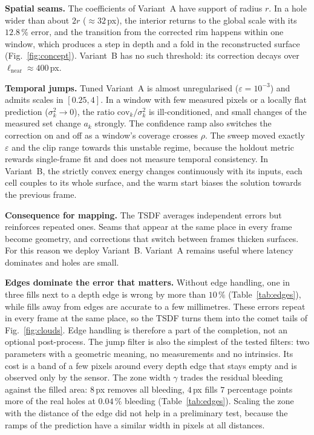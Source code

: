\documentclass[conference]{IEEEtran}
\begin{document}
\textbf{Spatial seams.} The coefficients of Variant~A have support of radius
\(r\). In a hole wider than about \(2r\) (\(\approx\!32\,\)px), the interior
returns to the global scale with its \(12.8\,\%\) error, and the transition
from the corrected rim happens within one window, which produces a step in
depth and a fold in the reconstructed surface (Fig.~\ref{fig:concept}).
Variant~B has no such threshold: its correction decays over
\(\ell_{\mathrm{near}}\approx400\,\)px.

\textbf{Temporal jumps.} Tuned Variant~A is almost unregularised
(\(\varepsilon=10^{-3}\)) and admits scales in \([0.25,4]\). In a window with
few measured pixels or a locally flat prediction (\(\sigma^2_k\to0\)), the
ratio \(\mathrm{cov}_k/\sigma^2_k\) is ill-conditioned, and small changes of
the measured set change \(a_k\) strongly. The confidence ramp also switches the
correction on and off as a window's coverage crosses \(\rho\). The sweep moved
exactly \(\varepsilon\) and the clip range towards this unstable regime,
because the holdout metric rewards single-frame fit and does not measure
temporal consistency. In Variant~B, the strictly convex energy changes
continuously with its inputs, each cell couples to its whole surface, and the
warm start biases the solution towards the previous frame.

\textbf{Consequence for mapping.} The TSDF averages independent errors but
reinforces repeated ones. Seams that appear at the same place in every frame
become geometry, and corrections that switch between frames thicken surfaces.
For this reason we deploy Variant~B. Variant~A remains useful where latency
dominates and holes are small.

\textbf{Edges dominate the error that matters.} Without edge handling, one in
three fills next to a depth edge is wrong by more than \(10\,\%\)
(Table~\ref{tab:edges}), while fills away from edges are accurate to a few
millimetres. These errors repeat in every frame at the same place, so the TSDF
turns them into the comet tails of Fig.~\ref{fig:clouds}. Edge handling is
therefore a part of the completion, not an optional post-process. The jump
filter is also the simplest of the tested filters: two parameters with a
geometric meaning, no measurements and no intrinsics. Its cost is a band of a
few pixels around every depth edge that stays empty and is observed only by the
sensor. The zone width \(\gamma\) trades the residual bleeding against the filled
area: \(8\,\)px removes all bleeding, \(4\,\)px fills \(7\) percentage points more
of the real holes at \(0.04\,\%\) bleeding (Table~\ref{tab:edges}). Scaling the
zone with the distance of the edge did not help in a preliminary test, because
the ramps of the prediction have a similar width in pixels at all distances.
\end{document}
